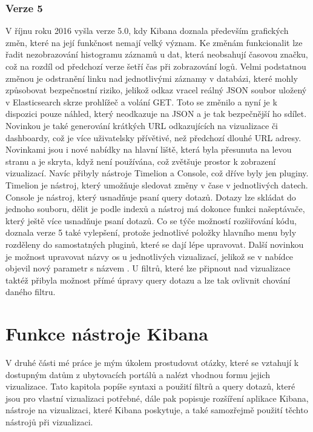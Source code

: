 \documentclass[czech,BP]{thesiskiv}
\begin{document}
 \subsection{Verze 5}
 V říjnu roku 2016 vyšla verze 5.0, kdy Kibana doznala především grafických změn, které na její funkčnost nemají velký význam. Ke změnám funkcionalit lze řadit nezobrazování histogramu záznamů u dat, která neobsahují časovou značku, což na rozdíl od předchozí verze šetří čas při zobrazování logů. Velmi podstatnou změnou je odstranění linku nad jednotlivými záznamy v databázi, které mohly způsobovat bezpečnostní riziko, jelikož odkaz vracel reálný JSON soubor uložený v Elasticsearch skrze prohlížeč a volání GET. Toto se změnilo a nyní je k dispozici pouze náhled, který neodkazuje na JSON a je tak bezpečnější ho sdílet. Novinkou je také generování krátkých URL odkazujících na vizualizace či dashboardy, což je více uživatelsky přívětivé, než předchozí dlouhé URL adresy. Novinkami jsou i nové nabídky na hlavní liště, která byla přesunuta na levou stranu a je skryta, když není používána, což zvětšuje prostor k zobrazení vizualizací. Navíc přibyly nástroje Timelion a Console, což dříve byly jen pluginy. Timelion je nástroj, který umožňuje sledovat změny v čase v jednotlivých datech. Console je nástroj, který usnadňuje psaní query dotazů. Dotazy lze skládat do jednoho souboru, dělit je podle indexů a nástroj má dokonce funkci našeptávače, který ještě více usnadňuje psaní dotazů. Co se týče možností rozšiřování kódu, doznala verze 5 také vylepšení, protože jednotlivé položky hlavního menu byly rozděleny do samostatných pluginů, které se dají lépe upravovat. Další novinkou je možnost upravovat názvy os u jednotlivých vizualizací, jelikož se v nabídce objevil nový parametr s názvem . U filtrů, které lze připnout nad vizualizace taktéž přibyla možnost přímé úpravy query dotazu a lze tak ovlivnit chování daného filtru. \cite{Kibana5intro}
 
 
\chapter{Funkce nástroje Kibana}
V druhé části mé práce je mým úkolem prostudovat otázky, které se vztahují k dostupným datům z ubytovacích portálů a nalézt vhodnou formu jejich vizualizace. Tato kapitola popíše syntaxi a použití filtrů a query dotazů, které jsou pro vlastní vizualizaci potřebné, dále pak popisuje rozšíření aplikace Kibana, nástroje na vizualizaci, které Kibana poskytuje, a také samozřejmě použití těchto nástrojů při vizualizaci.
\end{document}
